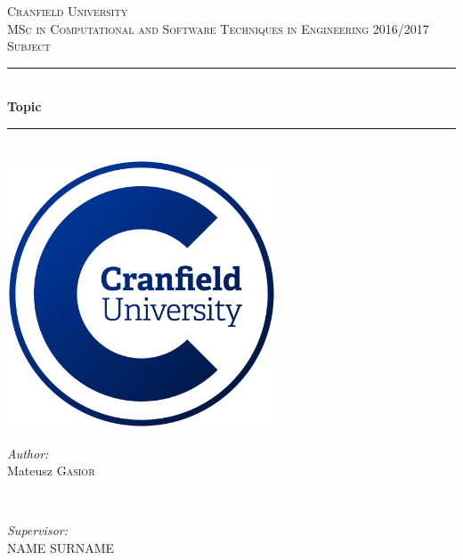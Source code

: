 \documentclass[a4paper]{report}
\begin{document}
	
	\begin{titlepage}
		\newcommand{\HRule}{\rule{\linewidth}{0.5mm}}
		
		\center
		
		\textsc{\LARGE Cranfield University}\\[1.5cm]
		\textsc{\Large MSc in Computational and Software Techniques in Engineering 2016/2017}\\[0.5cm]
		\textsc{\large Subject}\\[0.5cm]
		
		\HRule \\[0.4cm]
		{ \huge \bfseries Topic}\\[0.4cm]
		\HRule \\[1.5cm]
		
		\includegraphics[width=8cm]{img/cranfield-logo}\\[1cm]
		
		\vfill
		\begin{minipage}{0.4\textwidth}
			\begin{flushleft} \large
				\emph{Author:}\\
				Mateusz \textsc{Gasior}
			\end{flushleft}
		\end{minipage}
		~
		\begin{minipage}{0.4\textwidth}
			\begin{flushright} \large
				\emph{Supervisor:} \\
				NAME \textsc{SURNAME}
			\end{flushright}
		\end{minipage}\\[2cm]
		

\end{titlepage}
\end{document}
